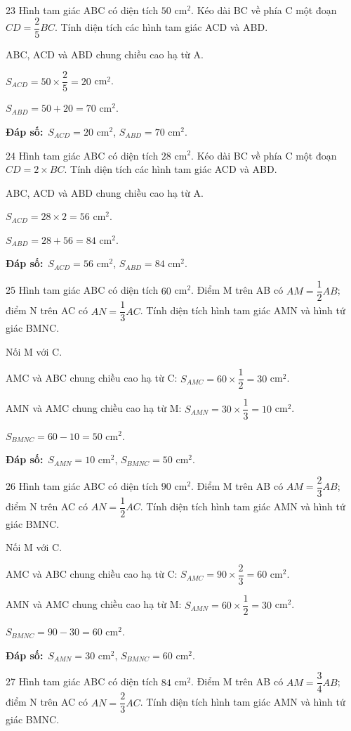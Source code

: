 \documentclass[11pt]{article}
\newif\ifsol \solfalse
\providecommand{\AnsWord}{Đáp số}
\newcommand{\dapso}[1]{\par\textbf{\AnsWord:}\ #1}
\newcommand{\probsol}[1]{%
  \begin{lrbox}{\solmeasure}\begin{minipage}{\dimexpr\linewidth-24pt\relax}#1\end{minipage}\end{lrbox}%
  \ifsol
    \begin{solbox}#1\end{solbox}%
  \else
    \setlength{\solht}{\dimexpr\ht\solmeasure+\dp\solmeasure+0.85cm\relax}%
    \ifdim\solht<1.35cm\setlength{\solht}{1.35cm}\fi
    \begin{tcolorbox}[colback=white,colframe=Line,boxrule=0.8pt,arc=5pt,
      left=8pt,right=8pt,top=4pt,bottom=4pt,height=\solht]{\footnotesize\color{Slate}\itshape\WorkWord}\end{tcolorbox}%
  \fi}
\newcommand{\gap}{\vspace{0.3cm}}
\def\WorkWord{Bài làm:}
\def\AnsWord{Đáp số}
\begin{document}
\gap
\begin{probbox}{23}{\relax}
Hình tam giác ABC có diện tích $50$ cm$^2$. Kéo dài BC về phía C một đoạn $CD=\dfrac25BC$. Tính diện tích các hình tam giác ACD và ABD.
\end{probbox}
\probsol{
ABC, ACD và ABD chung chiều cao hạ từ A.\par $S_{ACD}=50\times\dfrac{2}{5}=20$ cm$^2$.\par $S_{ABD}=50+20=70$ cm$^2$.
\dapso{$S_{ACD}=20$ cm$^2$, $S_{ABD}=70$ cm$^2$.}}
\gap
\begin{probbox}{24}{\relax}
Hình tam giác ABC có diện tích $28$ cm$^2$. Kéo dài BC về phía C một đoạn $CD=2\times BC$. Tính diện tích các hình tam giác ACD và ABD.
\end{probbox}
\probsol{
ABC, ACD và ABD chung chiều cao hạ từ A.\par $S_{ACD}=28\times2=56$ cm$^2$.\par $S_{ABD}=28+56=84$ cm$^2$.
\dapso{$S_{ACD}=56$ cm$^2$, $S_{ABD}=84$ cm$^2$.}}
\gap
\begin{probbox}{25}{\relax}
Hình tam giác ABC có diện tích $60$ cm$^2$. Điểm M trên AB có $AM=\dfrac{1}{2}AB$; điểm N trên AC có $AN=\dfrac{1}{3}AC$. Tính diện tích hình tam giác AMN và hình tứ giác BMNC.
\end{probbox}
\probsol{
Nối M với C.\par AMC và ABC chung chiều cao hạ từ C: $S_{AMC}=60\times\dfrac{1}{2}=30$ cm$^2$.\par AMN và AMC chung chiều cao hạ từ M: $S_{AMN}=30\times\dfrac{1}{3}=10$ cm$^2$.\par $S_{BMNC}=60-10=50$ cm$^2$.
\dapso{$S_{AMN}=10$ cm$^2$, $S_{BMNC}=50$ cm$^2$.}}
\gap
\begin{probbox}{26}{\relax}
Hình tam giác ABC có diện tích $90$ cm$^2$. Điểm M trên AB có $AM=\dfrac{2}{3}AB$; điểm N trên AC có $AN=\dfrac{1}{2}AC$. Tính diện tích hình tam giác AMN và hình tứ giác BMNC.
\end{probbox}
\probsol{
Nối M với C.\par AMC và ABC chung chiều cao hạ từ C: $S_{AMC}=90\times\dfrac{2}{3}=60$ cm$^2$.\par AMN và AMC chung chiều cao hạ từ M: $S_{AMN}=60\times\dfrac{1}{2}=30$ cm$^2$.\par $S_{BMNC}=90-30=60$ cm$^2$.
\dapso{$S_{AMN}=30$ cm$^2$, $S_{BMNC}=60$ cm$^2$.}}
\gap
\begin{probbox}{27}{\relax}
Hình tam giác ABC có diện tích $84$ cm$^2$. Điểm M trên AB có $AM=\dfrac{3}{4}AB$; điểm N trên AC có $AN=\dfrac{2}{3}AC$. Tính diện tích hình tam giác AMN và hình tứ giác BMNC.
\end{probbox}
\end{document}
